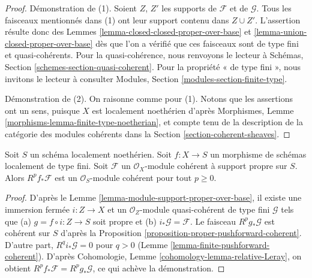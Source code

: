 \begin{proof}
Démonstration de (1). Soient $Z$, $Z'$ les supports de $\mathcal{F}$
et de $\mathcal{G}$. Tous les faisceaux mentionnés dans (1)
ont leur support contenu dans $Z \cup Z'$. L'assertion
résulte donc des Lemmes \ref{lemma-closed-closed-proper-over-base} et
\ref{lemma-union-closed-proper-over-base}
dès que l'on a vérifié que ces faisceaux sont de type fini
et quasi-cohérents. Pour la quasi-cohérence, nous renvoyons le lecteur à
Schémas, Section \ref{schemes-section-quasi-coherent}.
Pour la propriété « de type fini », nous invitons le lecteur à consulter
Modules, Section \ref{modules-section-finite-type}.

\medskip\noindent
Démonstration de (2). On raisonne comme pour (1). Notons que
les assertions ont un sens, puisque $X$ est localement noethérien d'après
Morphismes, Lemme \ref{morphisms-lemma-finite-type-noetherian},
et compte tenu de la description de la catégorie des modules
cohérents dans la Section \ref{section-coherent-sheaves}.
\end{proof}

\begin{lemma}
\label{lemma-support-proper-over-base-pushforward}
Soit $S$ un schéma localement noethérien.
Soit $f : X \to S$ un morphisme de schémas localement de type fini.
Soit $\mathcal{F}$ un $\mathcal{O}_X$-module cohérent
à support propre sur $S$. Alors $R^pf_*\mathcal{F}$
est un $\mathcal{O}_S$-module cohérent pour tout $p \geq 0$.
\end{lemma}

\begin{proof}
D'après le Lemme \ref{lemma-module-support-proper-over-base},
il existe une immersion fermée $i : Z \to X$ et
un $\mathcal{O}_Z$-module quasi-cohérent de type fini
$\mathcal{G}$ tels que (a) $g = f \circ i : Z \to S$ soit propre et (b)
$i_*\mathcal{G} = \mathcal{F}$.
Le faisceau $R^pg_*\mathcal{G}$ est cohérent sur $S$ d'après la
Proposition \ref{proposition-proper-pushforward-coherent}.
D'autre part, $R^qi_*\mathcal{G} = 0$ pour $q > 0$
(Lemme \ref{lemma-finite-pushforward-coherent}).
D'après Cohomologie, Lemme \ref{cohomology-lemma-relative-Leray},
on obtient $R^pf_*\mathcal{F} = R^pg_*\mathcal{G}$, ce qui achève la démonstration.
\end{proof}

